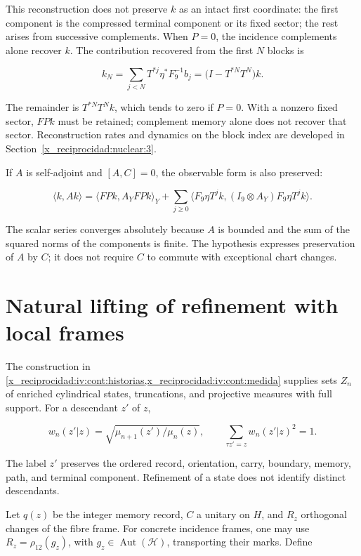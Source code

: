 This reconstruction does not preserve \(k\) as an intact first coordinate: the first component is the compressed terminal component or its fixed sector; the rest arises from successive complements. When \(P=0\), the incidence complements alone recover \(k\). The contribution recovered from the first \(N\) blocks is

\[
k_N=\sum_{j<N}T^{*j}\eta^*F_9^{-1}b_j
=\bigl(I-T^{*N}T^N\bigr)k.
\]

The remainder is \(T^{*N}T^Nk\), which tends to zero if \(P=0\). With a nonzero fixed sector, \(FPk\) must be retained; complement memory alone does not recover that sector. Reconstruction rates and dynamics on the block index are developed in Section~\ref{x_reciprocidad:nuclear:3}.

If \(A\) is self-adjoint and \([A,C]=0\), the observable form is also preserved:

\[
\langle k,Ak\rangle
=\langle FPk,A_YFPk\rangle_Y
+\sum_{j\ge0}\langle F_9\eta T^jk,(I_9\otimes A_Y)F_9\eta T^jk\rangle.
\]

The scalar series converges absolutely because \(A\) is bounded and the sum of the squared norms of the components is finite. The hypothesis expresses preservation of \(A\) by \(C\); it does not require \(C\) to commute with exceptional chart changes.

\section{Natural lifting of refinement with local frames}\label{x_reciprocidad:nuc05:refinamiento}

The construction in \cref{x_reciprocidad:iv:cont:historias,x_reciprocidad:iv:cont:medida} supplies sets \(Z_n\) of enriched cylindrical states, truncations, and projective measures with full support. For a descendant \(z'\) of \(z\),

\[
w_n(z'|z)=\sqrt{\mu_{n+1}(z')/\mu_n(z)},\qquad
\sum_{\tau z'=z}w_n(z'|z)^2=1.
\]

The label \(z'\) preserves the ordered record, orientation, carry, boundary, memory, path, and terminal component. Refinement of a state does not identify distinct descendants.

Let \(q(z)\) be the integer memory record, \(C\) a unitary on \(H\), and \(R_z\) orthogonal changes of the fibre frame. For concrete incidence frames, one may use \(R_z=\rho_{12}(g_z)\), with \(g_z\in\operatorname{Aut}(\mathcal H)\), transporting their marks. Define

